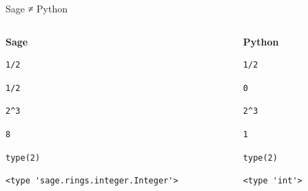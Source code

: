 \documentclass[presentation,smaller]{beamer}
\begin{document}
\begin{frame}[fragile,label={sec:org855ec46}]{Sage ≠ Python}
 \begin{columns}[t]
\begin{column}{0.45\columnwidth}
\textbf{Sage}

\lstset{language=sage,label= ,caption= ,captionpos=b,numbers=none}
\begin{lstlisting}
1/2
\end{lstlisting}

\begin{verbatim}
1/2
\end{verbatim}

\lstset{language=sage,label= ,caption= ,captionpos=b,numbers=none}
\begin{lstlisting}
2^3
\end{lstlisting}

\begin{verbatim}
8
\end{verbatim}

\lstset{language=sage,label= ,caption= ,captionpos=b,numbers=none}
\begin{lstlisting}
type(2)
\end{lstlisting}

\begin{verbatim}
<type 'sage.rings.integer.Integer'>
\end{verbatim}
\end{column}

\begin{column}{0.45\columnwidth}
\textbf{Python}

\lstset{language=Python,label= ,caption= ,captionpos=b,numbers=none}
\begin{lstlisting}
1/2
\end{lstlisting}

\begin{verbatim}
0
\end{verbatim}

\lstset{language=Python,label= ,caption= ,captionpos=b,numbers=none}
\begin{lstlisting}
2^3
\end{lstlisting}

\begin{verbatim}
1
\end{verbatim}

\lstset{language=Python,label= ,caption= ,captionpos=b,numbers=none}
\begin{lstlisting}
type(2)
\end{lstlisting}

\begin{verbatim}
<type 'int'>
\end{verbatim}
\end{column}
\end{columns}
\end{frame}
\end{document}
